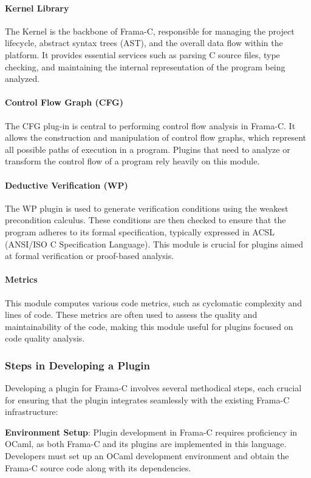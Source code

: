 \documentclass[10pt]{article}
\begin{document}
\begin{singlespace}
\paragraph*{Kernel Library}{The Kernel is the backbone of Frama-C, responsible for managing the project lifecycle, abstract syntax trees (AST), and the overall data flow within the platform. It provides essential services such as parsing C source files, type checking, and maintaining the internal representation of the program being analyzed.}

\paragraph*{Control Flow Graph (CFG)}{The CFG plug-in is central to performing control flow analysis in Frama-C. It allows the construction and manipulation of control flow graphs, which represent all possible paths of execution in a program. Plugins that need to analyze or transform the control flow of a program rely heavily on this module.}

\paragraph*{Deductive Verification (WP)}{The WP plugin is used to generate verification conditions using the weakest precondition calculus. These conditions are then checked to ensure that the program adheres to its formal specification, typically expressed in ACSL (ANSI/ISO C Specification Language). This module is crucial for plugins aimed at formal verification or proof-based analysis.}

\paragraph*{Metrics}{This module computes various code metrics, such as cyclomatic complexity and lines of code. These metrics are often used to assess the quality and maintainability of the code, making this module useful for plugins focused on code quality analysis.}

\subsubsection{Steps in Developing a Plugin}
Developing a plugin for Frama-C involves several methodical steps, each crucial for ensuring that the plugin integrates seamlessly with the existing Frama-C infrastructure:

\textbf{Environment Setup}: Plugin development in Frama-C requires proficiency in OCaml, as both Frama-C and its plugins are implemented in this language. Developers must set up an OCaml development environment and obtain the Frama-C source code along with its dependencies.


\end{singlespace}
\end{document}
